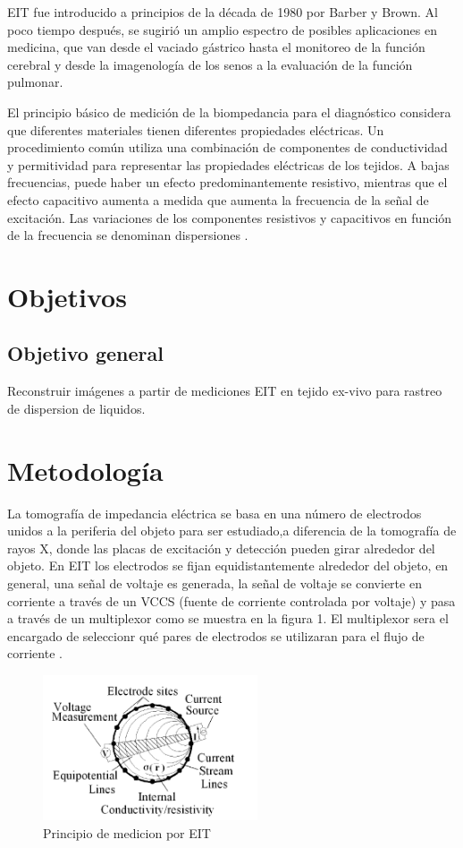 \documentclass{IEEEtran}
\begin{document}
EIT fue introducido a principios de la década de 1980 por Barber y Brown. Al poco tiempo después, se sugirió un amplio espectro de posibles aplicaciones en medicina, que van desde el vaciado gástrico hasta el monitoreo de la función cerebral y desde la imagenología de los senos a la evaluación de la función pulmonar\cite{Teschner2015}.

El principio básico de medición de la biompedancia para el diagnóstico considera que diferentes materiales tienen diferentes propiedades eléctricas. Un procedimiento común utiliza una combinación de componentes de conductividad y permitividad para representar las propiedades eléctricas de los tejidos. A bajas frecuencias, puede haber un efecto predominantemente resistivo, mientras que el efecto capacitivo aumenta a medida que aumenta la frecuencia de la señal de excitación.
Las variaciones de los componentes resistivos y capacitivos en función de la frecuencia se denominan dispersiones \cite{Schwan2003}.
\section{Objetivos}
\subsection{Objetivo general}
Reconstruir imágenes a partir de mediciones EIT en tejido ex-vivo para  rastreo de dispersion de liquidos.

\section{Metodología}
La tomografía de impedancia eléctrica se basa en una número de electrodos unidos a la periferia del objeto para ser estudiado,a diferencia de la tomografía de rayos X, donde las placas de excitación y detección pueden girar alrededor del objeto. En EIT los electrodos se fijan equidistantemente alrededor del objeto, en general, una señal de voltaje es generada, la señal de voltaje se convierte en corriente a través de un VCCS (fuente de corriente controlada por voltaje) y pasa a través de un multiplexor como se muestra en la figura 1. El multiplexor sera el encargado de seleccionr qué pares de electrodos se utilizaran para el flujo de corriente \cite{Gnecchi2010}.
\begin{figure}[h!]
\centering
\includegraphics[width=2.5in]{imagen1}
\caption{Principio de medicion por EIT}\label{ref:FiguraA}
\end{figure}



\end{document}
